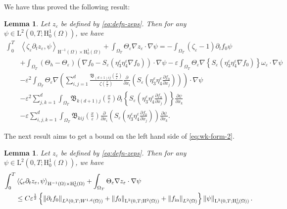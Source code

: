 \documentclass[preprint, 12pt]{amsart}
\numberwithin{equation}{section}
\newtheorem{lemma}[theorem]{Lemma}
\numberwithin{equation}{section}
\newcommand{\xeps}{\left(\frac{x}{\varepsilon}\right)}
\newcommand{\eps}{\varepsilon}
\begin{document}
We have thus proved the following result:
\begin{lemma}\label{lemma: higher regular time derivative}
Let $z_\eps$ be defined by \eqref{eq:defn-zeps}. Then for any $\psi \in \mathrm{L}^2(0,T;\mathrm H_0^1(\Omega))$, we have
\begin{equation}\label{eq:wk-form-2}
\begin{aligned}
\int_0^T & \left\langle \zeta_\eps\partial_{t}z_{\varepsilon},\psi \right\rangle_{\mathrm{H}^{-1}(\Omega) \times \mathrm{H}_0^1(\Omega)} 
+ \int_{\Omega_T} \Theta_\eps\nabla z_{\varepsilon} \cdot \nabla \psi
= - \int_{\Omega_T} (\zeta_\eps -1)\partial_{t}f_{0}\psi
\\
& 
+ \int_{\Omega_T}\left(\Theta_h - \Theta_\eps\right) \left( \nabla f_0 - S_\eps \left( \eta_3^\eps \eta_4^\eps \nabla f_0 \right) \right) \cdot \nabla \psi
- \eps \int_{\Omega_T} \Theta_\eps \nabla \left\{S_\eps \left( \eta_3^\eps \eta_4^\eps \nabla f_0 \right)\right\} \omega_\eps \cdot \nabla \psi
\\
&- \eps^2 \int_{\Omega_T} \Theta_\eps\nabla \left(\sum_{i,j=1}^d \frac{\mathfrak{B}_{(d+1)ij}\xeps}{\zeta\xeps} \frac{\partial}{\partial x_i} \left(S_\eps \left( \eta_3^\eps \eta_4^\eps \frac{\partial f_0}{\partial x_j}\right)\right)\right) \cdot \nabla \psi
\\
& - \eps^2 \sum_{j,k=1}^d \int_{\Omega_T} \mathfrak{B}_{k(d+1)j}\xeps \partial_t \left\{S_\eps \left( \eta_3^\eps \eta_4^\eps \frac{\partial f_0}{\partial x_j} \right)\right\} \frac{\partial\psi}{\partial x_k}
\\
& - \eps \sum_{i,j,k=1}^d \int_{\Omega_T} \mathfrak{B}_{kij}\xeps \frac{\partial}{\partial x_i} \left( S_\eps \left( \eta_3^\eps \eta_4^\eps \frac{\partial f_0}{\partial x_j} \right)\right) \frac{\partial\psi}{\partial x_k}.
\end{aligned}
\end{equation}
\end{lemma}
The next result aims to get a bound on the left hand side of \eqref{eq:wk-form-2}.
\begin{lemma}\label{lem:bound-weak-form-2}
Let $z_\eps$ be defined by \eqref{eq:defn-zeps}. Then for any $\psi \in \mathrm{L}^2(0,T;\mathrm H_0^1(\Omega))$, we have
\begin{equation*}
\begin{aligned}
\int_0^T & \left\langle \zeta_\eps\partial_{t}z_{\varepsilon},\psi \right\rangle_{\mathrm{H}^{-1}(\Omega) \times \mathrm{H}_0^1(\Omega)} 
+ \int_{\Omega_T} \Theta_\eps\nabla z_{\varepsilon} \cdot \nabla \psi
\\
& \le C \eps^{\frac12} \left\{ \left\Vert \partial_tf_0\right\Vert_{L^2(0,T;W^{1,d}(\Omega))} + \left\Vert f_0\right\Vert_{\mathrm L^2(0,T;\mathrm H^2(\Omega))} + \left\Vert f_{{\rm{in}}}\right\Vert_{L^2(\Omega)} \right\} \left\Vert \psi \right\Vert_{\mathrm L^2(0,T;\mathrm H^1_0(\Omega))}.
\end{aligned}
\end{equation*}
\end{lemma} 
\end{document}
